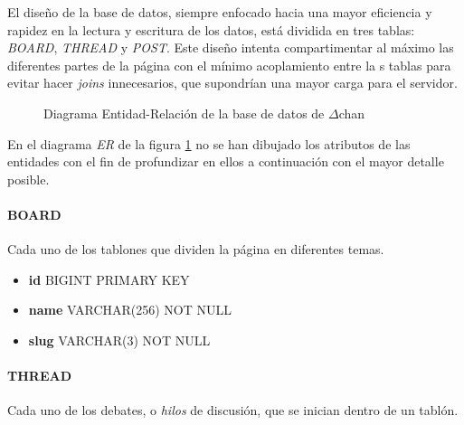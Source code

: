 \documentclass[12pt,a4paper,titlepage]{article}
\newcommand\projectname{$\Delta$chan}
\begin{document}
    El diseño de la base de datos, siempre enfocado hacia una mayor eficiencia y rapidez en la lectura y escritura de los datos, está dividida en tres tablas: \textit{BOARD}, \textit{THREAD} y \textit{POST}. Este diseño intenta compartimentar al máximo las diferentes partes de la página con el mínimo acoplamiento entre la s tablas para evitar hacer \textit{joins} innecesarios, que supondrían una mayor carga para el servidor.

    \begin{figure}[ht]
        \centering
        \caption{Diagrama Entidad-Relación de la base de datos de \projectname}
        \label{er:diagram}
    \end{figure}

    En el diagrama \emph{ER} de la figura \ref{er:diagram} no se han dibujado los atributos de las entidades con el fin de profundizar en ellos a continuación con el mayor detalle posible.

    \paragraph{BOARD} Cada uno de los tablones que dividen la página en diferentes temas.

    \begin{itemize}
        \item \textbf{id} BIGINT PRIMARY KEY
        \item \textbf{name} VARCHAR(256) NOT NULL
        \item \textbf{slug} VARCHAR(3) NOT NULL
    \end{itemize}

    \paragraph{THREAD} Cada uno de los debates, o \emph{hilos} de discusión, que se inician dentro de un tablón.
\end{document}
